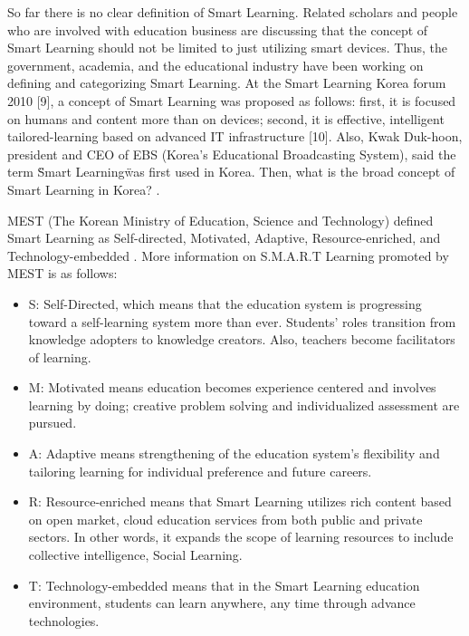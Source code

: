 \documentclass[journal]{vgtc}                %
\begin{document}
So far there is no clear definition of Smart Learning. Related scholars and people who are involved with education business are discussing that the concept of Smart Learning should not be limited to just utilizing smart devices. Thus, the government, academia, and the educational industry have been working on defining and categorizing Smart Learning. At the Smart Learning Korea forum 2010 [9], a concept of Smart Learning was proposed as follows: first, it is focused on humans and content more than on devices; second, it is effective, intelligent tailored-learning based on advanced IT infrastructure [10]. Also, Kwak Duk-hoon, president and CEO of EBS (Korea’s Educational Broadcasting System), said the term \"Smart Learning\" was first used in Korea. Then, what is the broad concept of Smart Learning in Korea? \cite{Kim2013a}.

MEST (The Korean Ministry of Education, Science and Technology) defined Smart Learning as Self-directed, Motivated, Adaptive, Resource-enriched, and Technology-embedded \cite{mest}. More information on S.M.A.R.T Learning promoted by MEST is as follows:
\begin{itemize}
  \item S: Self-Directed, which means that the education system is progressing toward a self-learning system more than ever. Students’ roles transition from knowledge adopters to knowledge creators. Also, teachers become facilitators of learning.
  \item M: Motivated means education becomes experience centered and involves learning by doing; creative problem solving and individualized assessment are pursued.
  \item A: Adaptive means strengthening of the education system’s flexibility and tailoring learning for individual preference and future careers.
  \item R: Resource-enriched means that Smart Learning utilizes rich content based on open market, cloud education services from both public and private sectors. In other words, it expands the scope of learning resources to include collective intelligence, Social Learning.
  \item T: Technology-embedded means that in the Smart Learning education environment, students can learn anywhere, any time through advance technologies.
\end{itemize}
\end{document}
